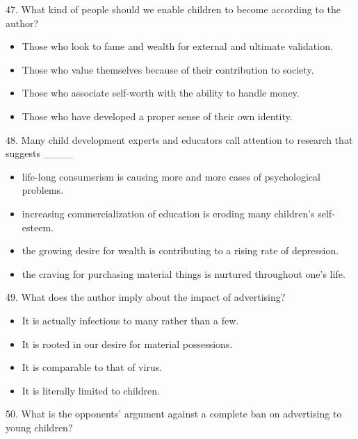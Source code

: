 \documentclass[UTF8,11pt]{ctexart}
\begin{document}
47. What kind of people should we enable children to become according to the author?


\begin{itemize}[leftmargin=2em,itemsep=.2em,topsep=.4em]\item[A.] Those who look to fame and wealth for external and ultimate validation.
\item[B.] Those who value themselves because of their contribution to society.
\item[C.] Those who associate self-worth with the ability to handle money.
\item[D.] Those who have developed a proper sense of their own identity.
\end{itemize}

48. Many child development experts and educators call attention to research that suggests \_\_\_\_


\begin{itemize}[leftmargin=2em,itemsep=.2em,topsep=.4em]\item[A.] life-long consumerism is causing more and more cases of psychological problems.
\item[B.] increasing commercialization of education is eroding many children’s self-esteem.
\item[C.] the growing desire for wealth is contributing to a rising rate of depression.
\item[D.] the craving for purchasing material things is nurtured throughout one’s life.
\end{itemize}

49. What does the author imply about the impact of advertising?


\begin{itemize}[leftmargin=2em,itemsep=.2em,topsep=.4em]\item[A.] It is actually infectious to many rather than a few.
\end{itemize}

\begin{itemize}[leftmargin=2em,itemsep=.2em,topsep=.4em]\item[B.] It is rooted in our desire for material possessions.
\item[C.] It is comparable to that of virus.
\item[D.] It is literally limited to children.
\end{itemize}

50. What is the opponents’ argument against a complete ban on advertising to young children?
\end{document}
